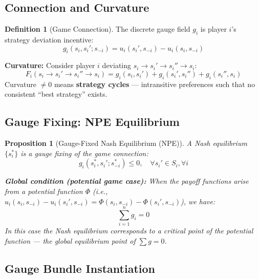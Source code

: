 \documentclass[12pt,a4paper]{article}
\theoremstyle{plain}
\newtheorem{proposition}[theorem]{Proposition}
\theoremstyle{definition}
\newtheorem{definition}[theorem]{Definition}
\begin{document}
\subsection{Connection and Curvature}

\begin{definition}[Game Connection]
The discrete gauge field $g_{i}$ is player $i$'s strategy deviation incentive:
\begin{equation}
    g_i(s_i, s_i'; s_{-i}) = u_i(s_i', s_{-i}) - u_i(s_i, s_{-i})
\end{equation}

\textbf{Curvature:} Consider player $i$ deviating $s_i \to s_i' \to s_i'' \to s_i$:
\begin{equation}
    F_i(s_i \to s_i' \to s_i'' \to s_i) = g_i(s_i, s_i') + g_i(s_i', s_i'') + g_i(s_i'', s_i)
\end{equation}
Curvature $\neq 0$ means \textbf{strategy cycles} — intransitive preferences such that no consistent ``best strategy'' exists.
\end{definition}

\subsection{Gauge Fixing: NPE Equilibrium}

\begin{proposition}[Gauge-Fixed Nash Equilibrium (NPE)]
A Nash equilibrium $\{s_i^*\}$ is a gauge fixing of the game connection:
\begin{equation}
    g_i(s_i^*, s_i'; s_{-i}^*) \leq 0, \quad \forall s_i' \in S_i, \forall i
\end{equation}

\textbf{Global condition (potential game case):} When the payoff functions arise from a potential function $\Phi$ (i.e., $u_i(s_i, s_{-i}) - u_i(s_i', s_{-i}) = \Phi(s_i, s_{-i}) - \Phi(s_i', s_{-i})$), we have:
\begin{equation}
    \sum_{i=1}^{n} g_i = 0
\end{equation}
In this case the Nash equilibrium corresponds to a critical point of the potential function — the global equilibrium point of $\sum g = 0$.
\end{proposition}

\subsection{Gauge Bundle Instantiation}
\end{document}
